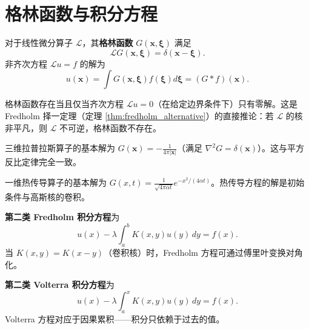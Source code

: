 \section{格林函数与积分方程}\label{sec:green_integral}

\begin{definition}[格林函数]\label{def:green_function}
对于线性微分算子 $\mathcal{L}$，其\textbf{格林函数} $G(\mathbf{x}, \boldsymbol{\xi})$ 满足
\[
\mathcal{L} G(\mathbf{x}, \boldsymbol{\xi}) = \delta(\mathbf{x} - \boldsymbol{\xi}).
\]
非齐次方程 $\mathcal{L} u = f$ 的解为
\[
u(\mathbf{x}) = \int G(\mathbf{x}, \boldsymbol{\xi}) f(\boldsymbol{\xi}) d\boldsymbol{\xi} = (G * f)(\mathbf{x}).
\]
\end{definition}

\begin{remark}[格林函数的存在性]\label{rem:green_existence}
格林函数存在当且仅当齐次方程 $\mathcal{L} u = 0$（在给定边界条件下）只有零解。这是 Fredholm 择一定理（定理 \ref{thm:fredholm_alternative}）的直接推论：若 $\mathcal{L}$ 的核非平凡，则 $\mathcal{L}$ 不可逆，格林函数不存在。
\end{remark}

\begin{example}[拉普拉斯算子的基本解]\label{ex:laplace_green}
三维拉普拉斯算子的基本解为 $G(\mathbf{x}) = -\frac{1}{4\pi |\mathbf{x}|}$（满足 $\nabla^2 G = \delta(\mathbf{x})$）。这与平方反比定律完全一致。
\end{example}

\begin{example}[热传导算子的基本解]\label{ex:heat_green}
一维热传导算子的基本解为 $G(x, t) = \frac{1}{\sqrt{4\pi\alpha t}} e^{-x^2/(4\alpha t)}$。热传导方程的解是初始条件与高斯核的卷积。
\end{example}

\begin{definition}\label{def:fredholm_integral_equation}
\textbf{第二类 Fredholm 积分方程}为
\[
u(x) - \lambda \int_a^b K(x, y) u(y) \, dy = f(x).
\]
当 $K(x, y) = K(x-y)$（卷积核）时，Fredholm 方程可通过傅里叶变换对角化。
\end{definition}

\begin{definition}\label{def:volterra_integral_equation}
\textbf{第二类 Volterra 积分方程}为
\[
u(x) - \lambda \int_a^x K(x, y) u(y) \, dy = f(x).
\]
Volterra 方程对应于因果累积——积分只依赖于过去的值。
\end{definition}

